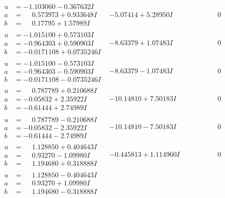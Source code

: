 \documentclass[1p]{elsarticle_modified}
\theoremstyle{definition}
\begin{document}
$$\begin{array}{c|c|c}
 \hline 
\begin{aligned}
u &= -1.103060 - 0.367632 I \\
a &= \phantom{-}0.573973 + 0.933648 I \\
b &= \phantom{-}0.17795 + 1.57989 I\end{aligned}
 & -5.07414 + 5.28950 I & \phantom{-0.000000 } 0 \\ \hline\begin{aligned}
u &= -1.015100 + 0.573103 I \\
a &= -0.964303 + 0.590903 I \\
b &= -0.0171108 + 0.0735246 I\end{aligned}
 & -8.63379 + 1.07483 I & \phantom{-0.000000 } 0 \\ \hline\begin{aligned}
u &= -1.015100 - 0.573103 I \\
a &= -0.964303 - 0.590903 I \\
b &= -0.0171108 - 0.0735246 I\end{aligned}
 & -8.63379 - 1.07483 I & \phantom{-0.000000 } 0 \\ \hline\begin{aligned}
u &= \phantom{-}0.787789 + 0.210688 I \\
a &= -0.05832 + 2.35922 I \\
b &= -0.61444 + 2.74989 I\end{aligned}
 & -10.14810 + 7.50183 I & \phantom{-0.000000 } 0 \\ \hline\begin{aligned}
u &= \phantom{-}0.787789 - 0.210688 I \\
a &= -0.05832 - 2.35922 I \\
b &= -0.61444 - 2.74989 I\end{aligned}
 & -10.14810 - 7.50183 I & \phantom{-0.000000 } 0 \\ \hline\begin{aligned}
u &= \phantom{-}1.128850 + 0.404643 I \\
a &= \phantom{-}0.93270 - 1.09980 I \\
b &= \phantom{-}1.194680 + 0.318888 I\end{aligned}
 & -0.445813 + 1.114960 I & \phantom{-0.000000 } 0 \\ \hline\begin{aligned}
u &= \phantom{-}1.128850 - 0.404643 I \\
a &= \phantom{-}0.93270 + 1.09980 I \\
b &= \phantom{-}1.194680 - 0.318888 I\end{aligned}

\end{array}$$
\end{document}
